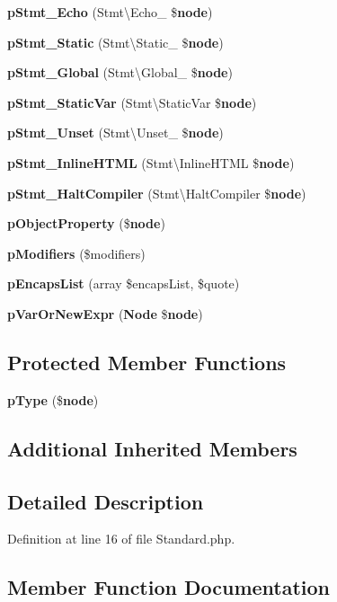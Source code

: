 \begin{DoxyCompactItemize}
\item 
{\bf p\+Stmt\+\_\+\+Echo} (Stmt\textbackslash{}\+Echo\+\_\+ \${\bf node})
\item 
{\bf p\+Stmt\+\_\+\+Static} (Stmt\textbackslash{}\+Static\+\_\+ \${\bf node})
\item 
{\bf p\+Stmt\+\_\+\+Global} (Stmt\textbackslash{}\+Global\+\_\+ \${\bf node})
\item 
{\bf p\+Stmt\+\_\+\+Static\+Var} (Stmt\textbackslash{}\+Static\+Var \${\bf node})
\item 
{\bf p\+Stmt\+\_\+\+Unset} (Stmt\textbackslash{}\+Unset\+\_\+ \${\bf node})
\item 
{\bf p\+Stmt\+\_\+\+Inline\+H\+T\+M\+L} (Stmt\textbackslash{}\+Inline\+H\+T\+M\+L \${\bf node})
\item 
{\bf p\+Stmt\+\_\+\+Halt\+Compiler} (Stmt\textbackslash{}\+Halt\+Compiler \${\bf node})
\item 
{\bf p\+Object\+Property} (\${\bf node})
\item 
{\bf p\+Modifiers} (\$modifiers)
\item 
{\bf p\+Encaps\+List} (array \$encaps\+List, \$quote)
\item 
{\bf p\+Var\+Or\+New\+Expr} ({\bf Node} \${\bf node})
\end{DoxyCompactItemize}
\subsection*{Protected Member Functions}
\begin{DoxyCompactItemize}
\item 
{\bf p\+Type} (\${\bf node})
\end{DoxyCompactItemize}
\subsection*{Additional Inherited Members}


\subsection{Detailed Description}


Definition at line 16 of file Standard.\+php.



\subsection{Member Function Documentation}
